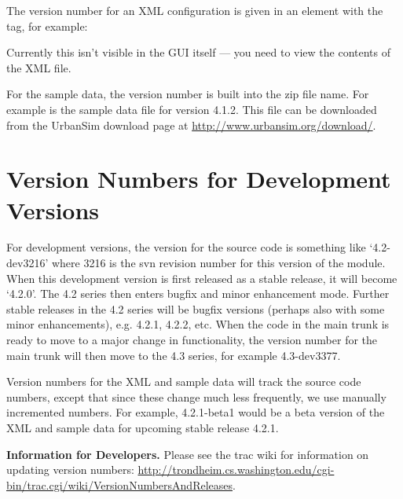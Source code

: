 The version number for an XML configuration is given in an element with the
 tag, for example:


Currently this isn't visible in the GUI itself --- you need to view the
contents of the XML file.

For the sample data, the version number is built into the zip file name.
For example  is the sample data file for version
4.1.2.  This file can be downloaded from the UrbanSim download page at
\url{http://www.urbansim.org/download/}.

\section{Version Numbers for Development Versions}

For development versions, the version for the source code is something like
`4.2-dev3216' where 3216 is the svn revision number for this version of the
module. When this development version is first released as a stable
release, it will become `4.2.0'. The 4.2 series then enters bugfix and
minor enhancement mode.  Further stable releases in the 4.2 series will be
bugfix versions (perhaps also with some minor enhancements), e.g. 4.2.1,
4.2.2, etc.  When the code in the main trunk is ready to move to a major
change in functionality, the version number for the main trunk will then
move to the 4.3 series, for example 4.3-dev3377.

Version numbers for the XML and sample data will track the source code
numbers, except that since these change much less frequently, we use
manually incremented numbers.  For example, 4.2.1-beta1 would be a beta
version of the XML and sample data for upcoming stable release 4.2.1.

{\bf Information for Developers.}  Please see the trac wiki for information
on updating version numbers:
\url{http://trondheim.cs.washington.edu/cgi-bin/trac.cgi/wiki/VersionNumbersAndReleases}.

